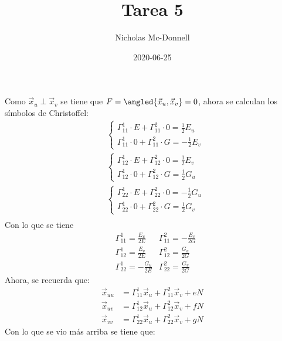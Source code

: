 \documentclass{homework}
\title{Tarea 5}
\date{2020-06-25}
\author{Nicholas Mc-Donnell}
\begin{document}
\maketitle
\newpage
{}

\begin{sol}
    Como \(\vec{x}_u\perp\vec{x}_v\) se tiene que \(F=\angled{\vec{x}_u,\vec{x}_v}=0\), ahora se calculan los símbolos de Christoffel:
    \begin{align*}
         & \begin{cases}
            \Gamma^1_{1 1}\cdot E+\Gamma^2_{1 1}\cdot 0=\frac12E_u \\
            \Gamma^1_{1 1}\cdot 0+\Gamma^2_{1 1}\cdot G=-\frac12E_v
        \end{cases} \\
         & \begin{cases}
            \Gamma^1_{1 2}\cdot E+\Gamma^2_{1 2}\cdot 0=\frac12E_v \\
            \Gamma^1_{1 2}\cdot 0+\Gamma^2_{1 2}\cdot G=\frac12G_u
        \end{cases} \\
         & \begin{cases}
            \Gamma^1_{2 2}\cdot E+\Gamma^2_{2 2}\cdot 0=-\frac12G_u \\
            \Gamma^1_{2 2}\cdot 0+\Gamma^2_{2 2}\cdot G=\frac12G_v
        \end{cases} \\
    \end{align*}
    Con lo que se tiene
    \begin{align*}
         & \Gamma^1_{1 1}=\frac{E_u}{2E}  & \Gamma^2_{1 1}=-\frac{E_v}{2G} \\
         & \Gamma^1_{1 2}=\frac{E_v}{2E}  & \Gamma^2_{1 2}=\frac{G_u}{2G}  \\
         & \Gamma^1_{2 2}=-\frac{G_u}{2E} & \Gamma^2_{2 2}=\frac{G_v}{2G}
    \end{align*}
    Ahora, se recuerda que:
    \begin{align*}
        \vec{x}_{uu} & = \Gamma_{11}^1 \vec{x}_u + \Gamma_{11}^2 \vec{x}_v +eN \\
        \vec{x}_{uv} & = \Gamma_{12}^1 \vec{x}_u + \Gamma_{12}^2 \vec{x}_v +fN \\
        \vec{x}_{vv} & = \Gamma_{22}^1 \vec{x}_u + \Gamma_{22}^2 \vec{x}_v +gN
    \end{align*}
    Con lo que se vio más arriba se tiene que:
    \begin{align*}

\end{align*}
\end{sol}
\end{document}
